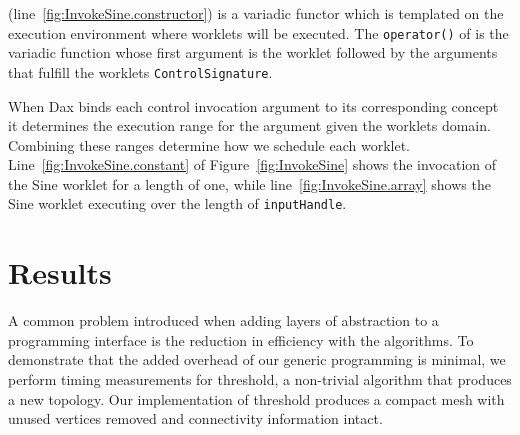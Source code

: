 \documentclass[conference]{IEEEtran}
\newcommand{\Ci}[1]{\color{blue}{#1}} %
\newcommand{\Cu}[1]{{\textbf{#1}}} %
\newcommand{\Code}[1]{{\small\texttt{#1}}}
\begin{document}


\Code{\Ci{Schedule}} (line~\ref{fig:InvokeSine.constructor}) is a variadic functor which is templated on the
execution environment where worklets will be executed. The \Code{operator()} of \Code{\Ci{Schedule}} is the variadic function
whose first argument is the worklet followed by the arguments that
fulfill the worklets \Code{ControlSignature}.

When Dax binds each control invocation argument to its corresponding concept it determines
the execution range for the argument given the worklets domain. Combining these ranges determine
how we schedule each worklet. Line~\ref{fig:InvokeSine.constant} of Figure~\ref{fig:InvokeSine} shows
the invocation of the Sine worklet for a length of one, while line~\ref{fig:InvokeSine.array}
shows the Sine worklet executing over the length of \Code{inputHandle}.

\section{Results}

\noindent
A common problem introduced when adding layers of abstraction to a
programming interface is the reduction in efficiency with the algorithms.
To demonstrate that the added overhead of our generic programming is
minimal, we perform timing measurements for threshold, a non-trivial
algorithm that produces a new topology.  Our implementation of threshold
produces a compact mesh with unused vertices removed and connectivity
information intact.
\end{document}
